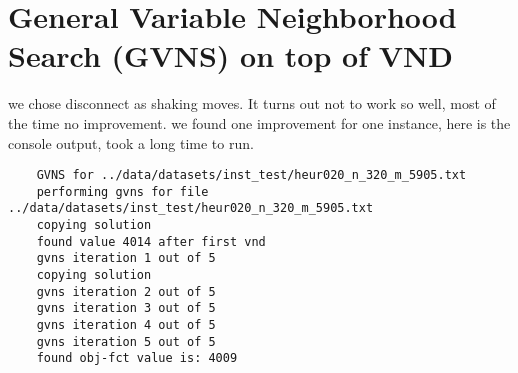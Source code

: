 \section{General Variable Neighborhood Search (GVNS) on top of VND}

we chose disconnect as shaking moves. It turns out not to work so well, most of the time no improvement.
we found one improvement for one instance, here is the console output, took a long time to run.

\begin{verbatim}
    GVNS for ../data/datasets/inst_test/heur020_n_320_m_5905.txt
    performing gvns for file ../data/datasets/inst_test/heur020_n_320_m_5905.txt
    copying solution
    found value 4014 after first vnd
    gvns iteration 1 out of 5
    copying solution
    gvns iteration 2 out of 5
    gvns iteration 3 out of 5
    gvns iteration 4 out of 5
    gvns iteration 5 out of 5
    found obj-fct value is: 4009
\end{verbatim}